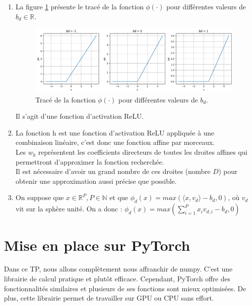 \documentclass[12pt,a4paper]{article}
\begin{document}
\begin{enumerate}
    \item La figure \ref{fig:random_relu} présente le tracé de la fonction $\phi(\cdot)$ pour différentes valeurs de $b_d \in \mathbb{R}$.
    
    \begin{figure}[ht]
        \centering
        \includegraphics[width=1\textwidth]{src/random_relu.png}
        \caption{Tracé de la fonction $\phi(\cdot)$ pour différentes valeurs de $b_d$.}
        \label{fig:random_relu}
    \end{figure}

    \newpage

    Il s'agit d'une fonction d'activation ReLU.\\


    \item La fonction h est une fonction d'activation ReLU appliquée à une combinaison linéaire, c'est donc une fonction affine par morceaux.\\
    Les $w_k$ représentent les coefficients directeurs de toutes les droites affines qui permettront d'approximer la fonction recherchée.\\

    Il est nécessaire d'avoir un grand nombre de ces droites (nombre $D$) pour obtenir une approximation aussi précise que possible.\\

    \item On suppose que $x \in \mathbb{R}^P, P \in \mathbb{N}$ et que $\phi_d(x) = max(\langle x, v_d\rangle - b_d, 0)$, où $v_d$ vit sur la sphère unité.
    On a donc : $\phi_d(x) = max(\sum_{i=1}^P x_i v_{d,i} - b_d, 0)$\\
\end{enumerate}


\section{Mise en place sur PyTorch}

Dans ce TP, nous allons complètement nous affranchir de numpy.
C’est une librairie de calcul pratique et plutôt efficace.
Cependant, PyTorch offre des fonctionnalités similaires et plusieurs de ses fonctions sont mieux optimisées.
De plus, cette librairie permet de travailler sur GPU ou CPU sans effort.\\
\end{document}
